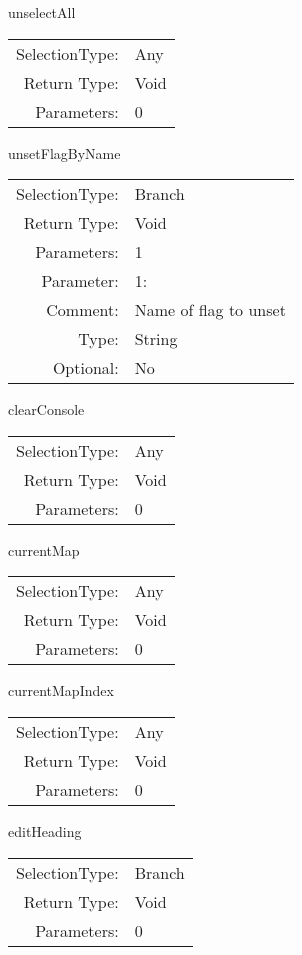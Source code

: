 \item unselectAll\\
\begin{tabular}{rl}
  SelectionType: & Any\\
    Return Type: & Void\\
     Parameters: & 0\\
\end{tabular}

\item unsetFlagByName\\
\begin{tabular}{rl}
  SelectionType: & Branch\\
    Return Type: & Void\\
     Parameters: & 1\\
   Parameter: &  1:\\
        Comment: & Name of flag to unset\\
           Type: & String\\
       Optional: &  No\\
\end{tabular}

\item clearConsole\\
\begin{tabular}{rl}
  SelectionType: & Any\\
    Return Type: & Void\\
     Parameters: & 0\\
\end{tabular}

\item currentMap\\
\begin{tabular}{rl}
  SelectionType: & Any\\
    Return Type: & Void\\
     Parameters: & 0\\
\end{tabular}

\item currentMapIndex\\
\begin{tabular}{rl}
  SelectionType: & Any\\
    Return Type: & Void\\
     Parameters: & 0\\
\end{tabular}

\item editHeading\\
\begin{tabular}{rl}
  SelectionType: & Branch\\
    Return Type: & Void\\
     Parameters: & 0\\
\end{tabular}

